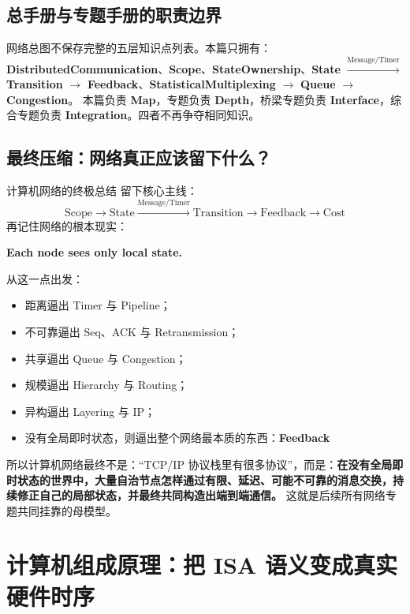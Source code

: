 \documentclass[11pt,a4paper,openany]{ctexbook}
\newcommand{\key}[1]{\textbf{\color{deep}#1}}
\begin{document}
\section{总手册与专题手册的职责边界}
网络总图不保存完整的五层知识点列表。本篇只拥有：\key{DistributedCommunication}、\key{Scope}、\key{StateOwnership}、\key{State} $\xrightarrow{\text{Message/Timer}}$ \key{Transition} $\rightarrow$ \key{Feedback}、\key{StatisticalMultiplexing} $\rightarrow$ \key{Queue} $\rightarrow$ \key{Congestion}。
本篇负责 \textbf{Map}，专题负责 \textbf{Depth}，桥梁专题负责 \textbf{Interface}，综合专题负责 \textbf{Integration}。四者不再争夺相同知识。

\section{最终压缩：网络真正应该留下什么？}
\begin{corebox}{计算机网络的终极总结}
留下核心主线：
\[
\text{Scope} \rightarrow \text{State} \xrightarrow{\text{Message/Timer}} \text{Transition} \rightarrow \text{Feedback} \rightarrow \text{Cost}
\]
再记住网络的根本现实：
\begin{center}
\textbf{Each node sees only local state.}
\end{center}

从这一点出发：
\begin{itemize}
    \item 距离逼出 Timer 与 Pipeline；
    \item 不可靠逼出 Seq、ACK 与 Retransmission；
    \item 共享逼出 Queue 与 Congestion；
    \item 规模逼出 Hierarchy 与 Routing；
    \item 异构逼出 Layering 与 IP；
    \item 没有全局即时状态，则逼出整个网络最本质的东西：\key{Feedback}
\end{itemize}

所以计算机网络最终不是：“TCP/IP 协议栈里有很多协议”，而是：\textbf{在没有全局即时状态的世界中，大量自治节点怎样通过有限、延迟、可能不可靠的消息交换，持续修正自己的局部状态，并最终共同构造出端到端通信。}
这就是后续所有网络专题共同挂靠的母模型。
\end{corebox}
\chapter{计算机组成原理：把 ISA 语义变成真实硬件时序}
\end{document}
